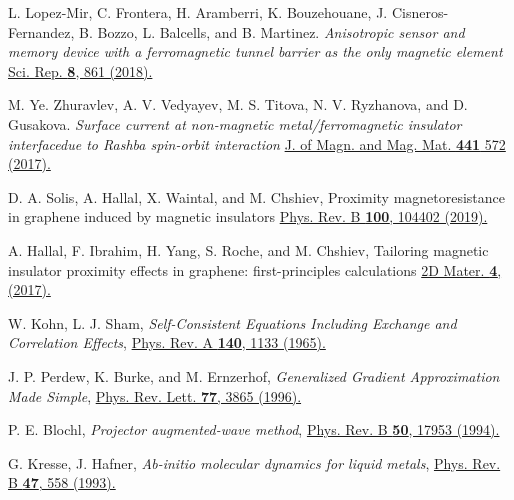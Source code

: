 \documentclass[10pt,pr,twocolumn,showpacs,amssymb,floatfix,superscriptaddress]{revtex4-1}
\begin{document}
\begin{thebibliography}{999}
 L. Lopez-Mir, C. Frontera, H. Aramberri, K. Bouzehouane, J. Cisneros-Fernandez, B. Bozzo, L. Balcells, and B. Martinez. 
\textit{Anisotropic sensor and memory device with a ferromagnetic tunnel barrier as the only magnetic element}
\href{https://doi.org/10.1038/s41598-017-19129-5}{Sci. Rep. {\bf 8}, 861 (2018).}

 M. Ye. Zhuravlev, A. V. Vedyayev, M. S. Titova, N. V. Ryzhanova, and D. Gusakova.
\textit{Surface current at non-magnetic metal/ferromagnetic insulator interfacedue to Rashba spin-orbit interaction}
\href{https://doi.org/10.1016/j.jmmm.2017.06.044}{J. of Magn. and Mag. Mat. {\bf 441} 572 (2017).}


 D. A. Solis, A. Hallal, X. Waintal, and M. Chshiev, 
Proximity magnetoresistance in graphene induced by magnetic insulators
\href{https://journals.aps.org/prb/abstract/10.1103/PhysRevB.100.104402}{Phys. Rev. B {\bf 100}, 104402 (2019).}


 A. Hallal, F. Ibrahim, H. Yang, S. Roche, and M. Chshiev,
Tailoring magnetic insulator proximity effects in graphene: first-principles calculations
\href{https://iopscience.iop.org/article/10.1088/2053-1583/aa6663}{2D Mater. {\bf 4}, (2017).}



W. Kohn, L. J. Sham, \emph{Self-Consistent Equations Including Exchange and Correlation Effects}, 
\href{https://journals.aps.org/pr/abstract/10.1103/PhysRev.140.A1133}{Phys. Rev. A \textbf{140}, 1133 (1965).}

J. P. Perdew, K. Burke, and M. Ernzerhof, \emph{Generalized Gradient Approximation Made Simple}, 
\href{https://journals.aps.org/prl/abstract/10.1103/PhysRevLett.77.3865}{Phys. Rev. Lett. \textbf{77}, 3865 (1996).}















P. E. Blochl, \emph{Projector augmented-wave method}, 
\href{https://journals.aps.org/prb/abstract/10.1103/PhysRevB.50.17953}{Phys. Rev. B \textbf{50}, 17953 (1994).}

G. Kresse, J. Hafner, \emph{Ab-initio molecular dynamics for liquid metals}, 
\href{https://journals.aps.org/prb/abstract/10.1103/PhysRevB.47.558}{Phys. Rev. B \textbf{47}, 558 (1993).}



\end{thebibliography}
\end{document}
